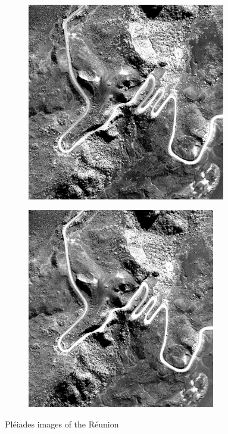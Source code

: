 \documentclass[paper=a4, fontsize=11pt, onecolumn, tikz, dvipsnames, svgnames, x11names]{article}
\begin{document}
            \begin{figure}[H]
            \centering
            \begin{subfigure}[b]{0.5\linewidth}
              \centering\includegraphics[width=0.95\textwidth]{figures/testdata_1.jpeg}
            \end{subfigure}%
            \begin{subfigure}[b]{0.5\linewidth}
              \centering\includegraphics[width=0.9\textwidth]{figures/testdata_2.jpeg}
            \end{subfigure}
            \caption{Pléiades images of the Réunion}
             \label{fig:testdata}
          \end{figure}
\end{document}
